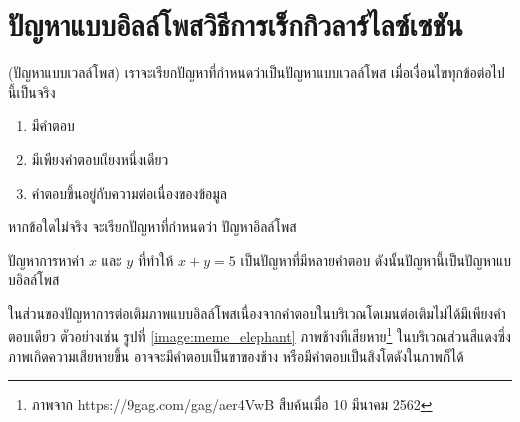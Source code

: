 \section{ปัญหาแบบอิลล์โพสวิธีการเร็กกิวลาร์ไลซ์เซชัน}

\begin{Definition}
    (ปัญหาแบบเวลล์โพส) เราจะเรียกปัญหาที่กำหนดว่าเป็นปัญหาแบบเวลล์โพส เมื่อเงื่อนไขทุกข้อต่อไปนี้เป็นจริง
    \begin{enumerate}
        \item มีคำตอบ
        \item มีเพียงคำตอบเเียงหนึ่งเดียว
        \item คำตอบขึ้นอยู่กับความต่อเนื่องของข้อมูล
    \end{enumerate}    
    หากข้อใดไม่จริง จะเรียกปัญหาที่กำหนดว่า ปัญหาอิลล์โพส
\end{Definition}


\begin{Example}
    \hspace{1cm} ปัญหาการหาค่า $x$ และ $y$ ที่ทำให้ $x+y = 5$ เป็นปัญหาที่มีหลายคำตอบ ดังนั้นปัญหานี้เป็นปัญหาแบบอิลล์โพส
    \label{example:x_plus_y_5}
\end{Example}

\hspace{1cm} ในส่วนของปัญหาการต่อเติมภาพแบบอิลล์โพสเนื่องจากคำตอบในบริเวณโดเมนต่อเติมไม่ได้มีเพียงคำตอบเดียว ตัวอย่างเช่น รูปที่ \ref{image:meme_elephant} ภาพช้างทีเสียหาย\footnote{ภาพจาก https://9gag.com/gag/aer4VwB สืบค้นเมื่อ 10 มีนาคม 2562} ในบริเวณส่วนสีแดงซึ่งภาพเกิดความเสียหายขึ้น อาจจะมีคำตอบเป็นขาของช้าง หรือมีคำตอบเป็นสิงโตดังในภาพก็ได้

